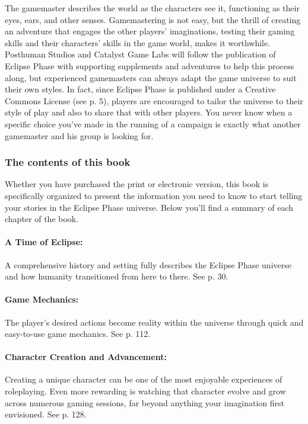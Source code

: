 The gamemaster describes the world as the characters see it, functioning as their eyes, ears, and other senses. Gamemastering is not easy, but the thrill of creating an adventure that engages the other players' imaginations, testing their gaming skills and their characters' skills in the game world, makes it worthwhile. Posthuman Studios and Catalyst Game Labs will follow the publication of Eclipse Phase with supporting supplements and adventures to help this process along, but experienced gamemasters can always adapt the game universe to suit their own styles. In fact, since Eclipse Phase is published under a Creative Commons License (see p. 5), players are encouraged to tailor the universe to their style of play and also to share that with other players. You never know when a specific choice you've made in the running of a campaign is exactly what another gamemaster and his group is looking for. 

\subsubsection{The contents of this book} \label{sec:contents-this-book} 

Whether you have purchased the print or electronic version, this book is specifically organized to present the information you need to know to start telling your stories in the Eclipse Phase universe. Below you'll find a summary of each chapter of the book. 

\paragraph{A Time of Eclipse:} A comprehensive history and setting fully describes the Eclipse Phase universe and how humanity transitioned from here to there. See p. 30. 

\paragraph{Game Mechanics:} The player's desired actions become reality within the universe through quick and easy-to-use game mechanics. See p. 112. 

\paragraph{Character Creation and Advancement:} Creating a unique character can be one of the most enjoyable experiences of roleplaying. Even more rewarding is watching that character evolve and grow across numerous gaming sessions, far beyond anything your imagination first envisioned. See p. 128. 

